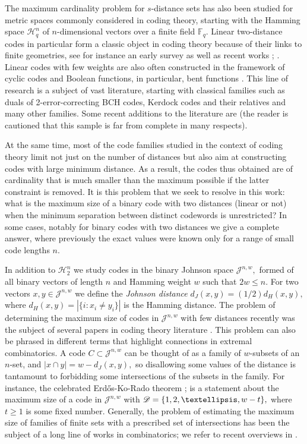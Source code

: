\documentclass{amsart}
\newcommand{\cH}{\mathcal{H}}
\newcommand{\cJ}{\mathcal{J}}
\newcommand{\ff}{{\mathbb F}}
\begin{document}
The maximum cardinality problem for $s$-distance sets has also been studied for metric spaces commonly considered in coding theory, 
starting with the Hamming space $\cH_q^n$ of $n$-dimensional vectors over a finite field $\ff_q.$ Linear two-distance codes in particular
form a classic object in coding theory because of their links to finite geometries, see for instance an early survey \cite{CK86} as well as recent works \cite{SHS+21}; \cite[Ch.7]{BvM22}. Linear codes with few weights are also often
constructed in the framework of cyclic codes and Boolean functions, in particular, bent functions \cite{M18}. 
This line of research is a subject of vast literature, starting with classical families such as duals of 2-error-correcting BCH codes, Kerdock codes and their relatives \cite{MS77} and many other families. Some recent additions to the literature are \cite{WZHZ15,D16,LLHQ21} (the reader is cautioned that this sample is far from complete in many respects).

At the same time, most of the code families studied in the context of coding theory limit not just on the number of distances but also
aim at constructing codes with large minimum distance. As a result, the codes thus obtained are of cardinality that is much smaller than 
the maximum possible if the latter constraint is removed. It is this problem that we seek to resolve in this work: what is the maximum size
of a binary code with two distances (linear or not) when the minimum separation between distinct codewords is unrestricted?
In some cases, notably for binary codes with two distances we give a complete answer, where previously the exact values were 
known only for a range of small code lengths $n$.

In addition to $\cH_{2}^{n}$ we study codes in the binary Johnson space $\cJ^{n, w},$ formed of all binary vectors of length $n$ and Hamming weight $w$ such that $2w \leq n$. For two vectors $x,y\in \cJ^{n,w}$ we define the {\em Johnson distance} $d_J(x,y)=(1/2)d_H(x,y),$ where $d_H(x,y)=|\{i: x_i
\ne y_i\}|$ is the Hamming distance. The problem of determining the maximum size of codes in $\cJ^{n,w}$ with few distances recently was the subject of several papers in coding theory literature \cite{BM11,MN11}. This problem can also be phrased in different terms that highlight connections in extremal combinatorics. A code $C\subset \cJ^{n,w}$ can be thought of as a family of $w$-subsets of an $n$-set, and $|x\cap y|=w-d_J(x,y),$ so disallowing some values of the distance is tantamount to forbidding some intersections of the subsets in the family. For instance, the celebrated Erd{\H o}s-Ko-Rado theorem \cite{EKR61}; \cite{FT18,GM16} is a statement about the maximum size of a code in $\cJ^{n,w}$ with $\sD=\{1,2,\dots,w-t\},$ where $t\ge1$ is some fixed number. Generally, the problem of estimating the maximum size of families of finite sets with a prescribed set of intersections has been the subject of a long line of works in combinatorics; we refer to recent overviews in \cite{FT18,E22}.
\end{document}

